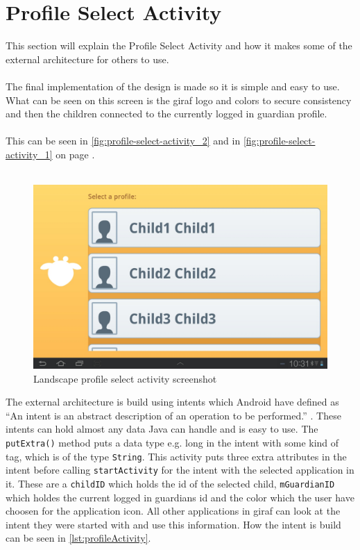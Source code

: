 \section{Profile Select Activity}
This section will explain the Profile Select Activity and how it makes some of the external architecture for others to use.\\\\
The final implementation of the design is made so it is simple and easy to use. What can be seen on this screen is the giraf logo and colors to secure consistency and then the children connected to the currently logged in guardian profile.\\\\
This can be seen in \autoref{fig:profile-select-activity_2} and in \autoref{fig:profile-select-activity_1} on page . \\\\

\begin{figure}[h!]
	\centering
	\includegraphics[scale=0.3]{gfx/profile-select-activity_2.jpg}
	\caption{Landscape profile select activity screenshot}
	\label{fig:profile-select-activity_2}
\end{figure}

The external architecture is build using intents which Android have defined as ``An intent is an abstract description of an operation to be performed.'' \citep{android:intent}. These intents can hold almost any data Java can handle and is easy to use. The \verb+putExtra()+ method puts a data type e.g. long in the intent with some kind of tag, which is of the type \verb+String+. This activity puts three extra attributes in the intent before calling \verb+startActivity+ for the intent with the selected application in it. These are a \verb+childID+ which holds the id of the selected child, \verb+mGuardianID+ which holdes the current logged in guardians id and the color which the user have choosen for the application icon. All other applications in giraf can look at the intent they were started with and use this information. How the intent is build can be seen in \autoref{lst:profileActivity}.

